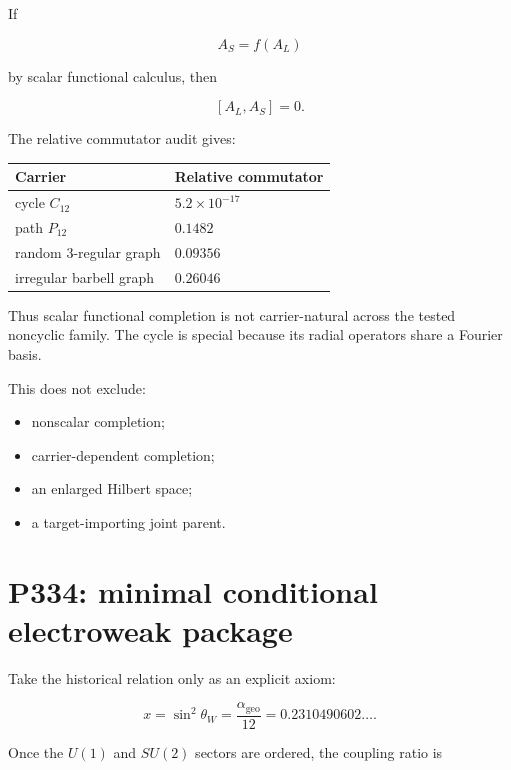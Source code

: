 \documentclass[11pt,a4paper,openany]{report}
\begin{document}
If

\[
A_S=f(A_L)
\]

by scalar functional calculus, then

\[
[A_L,A_S]=0.
\]

The relative commutator audit gives:

\begin{center}
\begingroup\small
\setlength{\tabcolsep}{2.5pt}
\renewcommand{\arraystretch}{1.16}
\begin{longtable}{@{}p{}p{}@{}}
\toprule
\textbf{Carrier} & \textbf{Relative commutator} \\
\midrule
\endhead
cycle \(C_{12}\) & \(5.2\times10^{-17}\) \\
path \(P_{12}\) & \(0.1482\) \\
random 3-regular graph & \(0.09356\) \\
irregular barbell graph & \(0.26046\) \\
\bottomrule
\end{longtable}
\endgroup
\end{center}

Thus scalar functional completion is not carrier-natural across the tested noncyclic family.  The cycle is special because its radial operators share a Fourier basis.

This does not exclude:

\begin{itemize}
\item 
nonscalar completion;

\item 
carrier-dependent completion;

\item 
an enlarged Hilbert space;

\item 
a target-importing joint parent.

\end{itemize}

\section{P334: minimal conditional electroweak package}

Take the historical relation only as an explicit axiom:

\[
x=
\sin^2\theta_W
=\frac{\alpha_{\mathrm{geo}}}{12}
=0.2310490602\ldots.
\]

Once the \(U(1)\) and \(SU(2)\) sectors are ordered, the coupling ratio is
\end{document}
